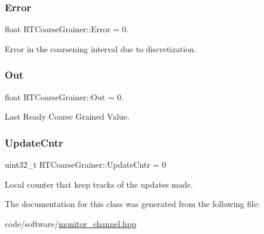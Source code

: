 \mbox{\label{classRTCoarseGrainer_a80a8cf362112f12a0f7acbeabf2477b2}} 
\subsubsection{\texorpdfstring{Error}{Error}}
{\footnotesize\ttfamily float R\+T\+Coarse\+Grainer\+::\+Error = 0.}



Error in the coarsening interval due to discretization. 

\mbox{\label{classRTCoarseGrainer_a341ec4b52b5f79b15102fc1641a93b8f}} 
\subsubsection{\texorpdfstring{Out}{Out}}
{\footnotesize\ttfamily float R\+T\+Coarse\+Grainer\+::\+Out = 0.}



Last Ready Coarse Grained Value. 

\mbox{\label{classRTCoarseGrainer_aea262e8f08584c79ac097e8d57dfa909}} 
\subsubsection{\texorpdfstring{Update\+Cntr}{UpdateCntr}}
{\footnotesize\ttfamily uint32\+\_\+t R\+T\+Coarse\+Grainer\+::\+Update\+Cntr = 0}



Local counter that keep tracks of the updates made. 



The documentation for this class was generated from the following file\+:\begin{DoxyCompactItemize}
\item 
code/software/\hyperlink{monitor__channel_8hpp}{monitor\+\_\+channel.\+hpp}\end{DoxyCompactItemize}
